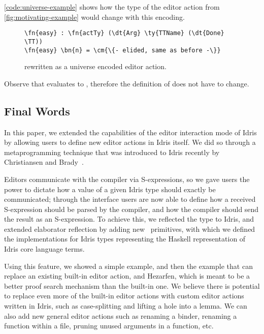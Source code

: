 \autoref{code:universe-example} shows how the type of the  editor
action from \autoref{fig:motivating-example} would change with this encoding.

\begin{figure}[H]
\begin{Verbatim}
\fn{easy} : \fn{actTy} (\dt{Arg} \ty{TTName} (\dt{Done} \TT))
\fn{easy} \bn{n} = \cm{\{- elided, same as before -\}}
\end{Verbatim}
\caption{  rewritten as a universe encoded editor action.}
\label{code:universe-example}
\end{figure}

Observe that  evaluates
to , therefore the definition of  does
not have to change.


\subsection{Final Words}

In this paper, we extended the capabilities of the editor interaction mode of
Idris by allowing users to define new editor actions in Idris itself. We did
so through a metaprogramming technique that was introduced to Idris recently by
Christiansen and Brady~\cite{elabref}.

Editors communicate with the compiler via S-expressions, so we gave users the
power to dictate how a value of a given Idris type should exactly be
communicated; through the  interface users are now able to
define how a received S-expression should be parsed by the compiler, and how
the compiler should send the result as an S-expression. To achieve this, we
reflected the  type to Idris, and extended elaborator reflection
by adding new \Elab\ primitives, with which we defined the 
implementations for Idris types representing the Haskell representation of
Idris core language terms.

Using this feature, we showed a simple  example, and then the
 example that can replace an existing built-in editor action,
and Hezarfen, which is meant to be a better proof search mechanism than the
built-in one. We believe there is potential to replace even more of the
built-in editor actions with custom editor actions written in Idris, such as
case-splitting and lifting a hole into a lemma. We can also add new general
editor actions such as renaming a binder, renaming a function within a file,
pruning unused arguments in a function, etc.

